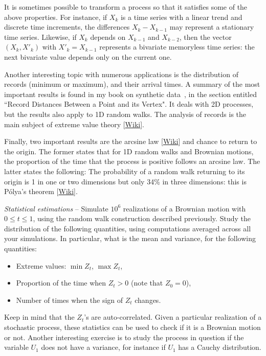 \documentclass[oneside,10pt]{book}
\begin{document}
\noindent It is sometimes possible to transform a process so that it satisfies some of the above properties. For instance, if $X_k$ is a time series with a linear trend and discrete time increments, the differences $X_k - X_{k-1}$ may represent a stationary  time series. Likewise, if 
$X_k$ depends on $X_{k-1}$ and $X_{k-2}$, then the vector $(X_k, X'_k)$ with $X'_k = 
X_{k-1}$ represents a bivariate memoryless time series: the next bivariate value depends only on the current one.

Another interesting topic with numerous applications is the distribution of records (minimum or maximum), and their arrival times. A summary of the most important results  is found in my book on synthetic data~\cite{vgsynthetic}, in the section 
entitled ``Record Distances Between a Point and its Vertex". It deals with 2D processes, but the results also apply to 1D random walks. The analysis of records is the main subject of \textcolor{index}{extreme value theory} [\href{https://en.wikipedia.org/wiki/Extreme_value_theory}{Wiki}]. 

Finally, two important results are the \textcolor{index}{arcsine law} [\href{https://en.wikipedia.org/wiki/Arcsine_laws_(Wiener_process)}{Wiki}] and chance to return to the origin. The former states that for 1D random walks and Brownian motions, the proportion of the time that the process is positive follows an arcsine law. The latter states the following: The probability of a random walk returning to its origin is 1 in one or two dimensions but only 34\% in three dimensions: 
this is \textcolor{index}{Pólya's theorem} [\href{https://mathworld.wolfram.com/PolyasRandomWalkConstants.html}{Wiki}]. 

\begin{Exercise} {\em Statistical estimations} -- Simulate $10^6$ realizations of a Brownian motion with $0\leq t \leq 1$, using the random walk construction described previously. Study the distribution of the following quantities, using computations averaged across all your simulations. In particular, what is the mean and variance, for the following quantities:
\begin{itemize}
	\item Extreme values: $\min Z_t$, $\max Z_t$, 
	\item Proportion of the time when $Z_t > 0$ (note that $Z_0 = 0$),
	\item Number of times when the sign of $Z_t$ changes.
\end{itemize}
Keep in mind that the $Z_t$'s are auto-correlated. Given a particular realization of a stochastic process, these statistics can be used to check if it is a Brownian motion or not. Another interesting exercise is to study the process in question if the variable $U_1$ does not have a variance, for instance if $U_1$ has a Cauchy distribution. 
\end{Exercise}
\end{document}
